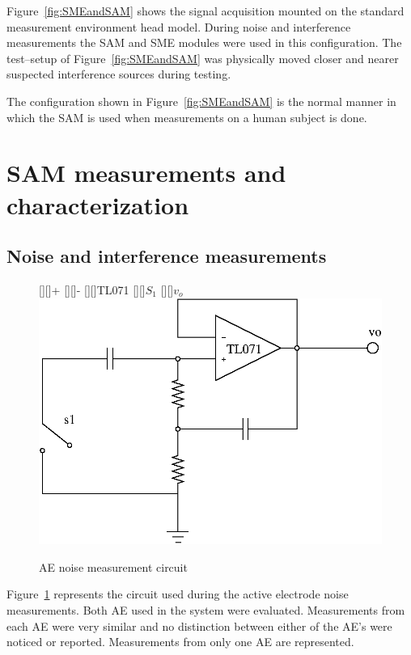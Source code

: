 Figure~\ref{fig:SMEandSAM} shows the signal acquisition mounted on the
standard measurement environment head model. During noise and
interference measurements the SAM and SME modules were used in this
configuration. The test--setup of Figure~\ref{fig:SMEandSAM} was
physically moved closer and nearer suspected interference sources
during testing.

The configuration shown in Figure~\ref{fig:SMEandSAM} is the normal
manner in which the SAM is used when measurements on a human subject
is done.

\section{SAM measurements and characterization}

\subsection{Noise and interference measurements}

\begin{figure}[htbp]
\begin{center}
	\psfrag{+}[][]{+}
	\psfrag{-}[][]{-}
	[][]{TL071}
	[][]{$S_1$}
	[][]{$v_o$}
	\includegraphics*{ae-m.eps}
	\caption{AE noise measurement circuit}
	\label{fig:ae-m}
\end{center}
\end{figure}

Figure~\ref{fig:ae-m} represents the circuit used during the active
electrode noise measurements. Both AE used in the system were
evaluated. Measurements from each AE were very similar and no
distinction between either of the AE's were noticed or reported.
Measurements from only one AE are represented.

